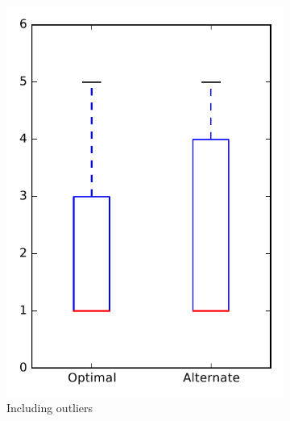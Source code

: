 
\begin{figure}
    \centering
    \begin{subfigure}{.4\textwidth}
        \centering
        \includegraphics[height=0.4\textheight]{figures/combo/dit_rq2_bookkeeper}
        \caption{Including outliers}\label{fig:combo:dit:rq2:bookkeeper_outlier}
    \end{subfigure}%
    \begin{subfigure}{.4\textwidth}
        \centering

\end{subfigure}
\end{figure}
